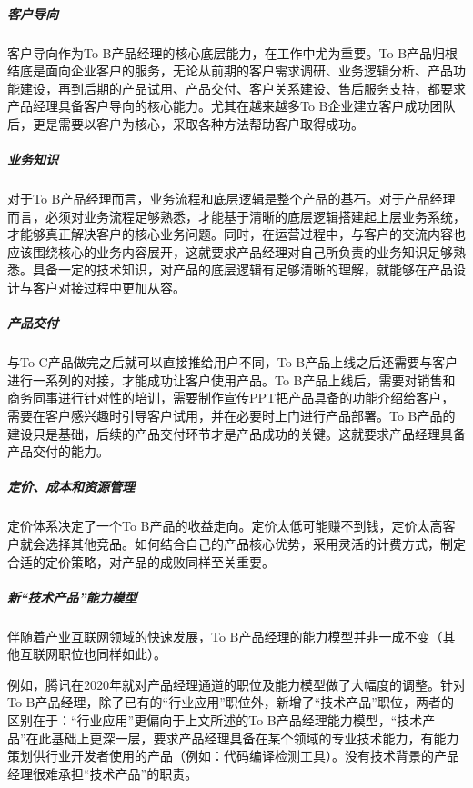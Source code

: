 \documentclass[letterpaper,10pt,english]{sphinxmanual}
\begin{document}
\subparagraph{客户导向}
\label{\detokenize{chapter_introduction/2B:id35}}
客户导向作为To B产品经理的核心底层能力，在工作中尤为重要。To
B产品归根结底是面向企业客户的服务，无论从前期的客户需求调研、业务逻辑分析、产品功能建设，再到后期的产品试用、产品交付、客户关系建设、售后服务支持，都要求产品经理具备客户导向的核心能力。尤其在越来越多To
B企业建立客户成功团队后，更是需要以客户为核心，采取各种方法帮助客户取得成功。


\subparagraph{业务知识}
\label{\detokenize{chapter_introduction/2B:id36}}
对于To
B产品经理而言，业务流程和底层逻辑是整个产品的基石。对于产品经理而言，必须对业务流程足够熟悉，才能基于清晰的底层逻辑搭建起上层业务系统，才能够真正解决客户的核心业务问题。同时，在运营过程中，与客户的交流内容也应该围绕核心的业务内容展开，这就要求产品经理对自己所负责的业务知识足够熟悉。具备一定的技术知识，对产品的底层逻辑有足够清晰的理解，就能够在产品设计与客户对接过程中更加从容。


\subparagraph{产品交付}
\label{\detokenize{chapter_introduction/2B:id37}}
与To C产品做完之后就可以直接推给用户不同，To
B产品上线之后还需要与客户进行一系列的对接，才能成功让客户使用产品。To
B产品上线后，需要对销售和商务同事进行针对性的培训，需要制作宣传PPT把产品具备的功能介绍给客户，需要在客户感兴趣时引导客户试用，并在必要时上门进行产品部署。To
B产品的建设只是基础，后续的产品交付环节才是产品成功的关键。这就要求产品经理具备产品交付的能力。


\subparagraph{定价、成本和资源管理}
\label{\detokenize{chapter_introduction/2B:id38}}
定价体系决定了一个To
B产品的收益走向。定价太低可能赚不到钱，定价太高客户就会选择其他竞品。如何结合自己的产品核心优势，采用灵活的计费方式，制定合适的定价策略，对产品的成败同样至关重要。


\subparagraph{新“技术产品”能力模型}
\label{\detokenize{chapter_introduction/2B:id39}}
伴随着产业互联网领域的快速发展，To
B产品经理的能力模型并非一成不变（其他互联网职位也同样如此）。

例如，腾讯在2020年就对产品经理通道的职位及能力模型做了大幅度的调整。针对To
B产品经理，除了已有的“行业应用”职位外，新增了“技术产品”职位，两者的区别在于：“行业应用”更偏向于上文所述的To
B产品经理能力模型，“技术产品”在此基础上更深一层，要求产品经理具备在某个领域的专业技术能力，有能力策划供行业开发者使用的产品（例如：代码编译检测工具）。没有技术背景的产品经理很难承担“技术产品”的职责。
\end{document}
